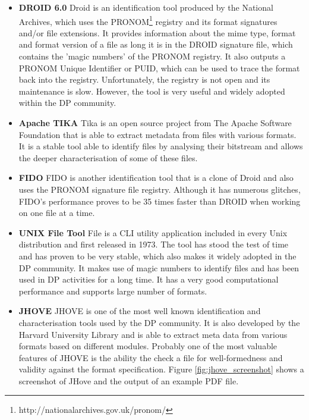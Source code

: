 \begin{itemize}
\item \textbf{DROID 6.0}\newline
Droid is an identification tool produced by the National Archives, which uses the PRONOM\footnote{http://nationalarchives.gov.uk/pronom/} registry and its format signatures and/or file extensions. It provides information about the mime type, format and format version of a file as long it is in the DROID signature file, which contains the 'magic numbers' of the PRONOM registry. It also outputs a PRONOM Unique Identifier or PUID, which can be used to trace the format back into the registry.
Unfortunately, the registry is not open and its maintenance is slow. However, the tool is very useful and widely adopted within the DP community.

\item \textbf{Apache TIKA}\newline
Tika is an open source project from The Apache Software Foundation that is able to extract metadata from files with various formats. It is a stable tool able to identify files by analysing their bitstream and allows the deeper characterisation of some of these files.  

\item \textbf{FIDO}\newline
FIDO is another identification tool that is a clone of Droid and also uses the PRONOM signature file registry. Although it has numerous glitches, FIDO's performance proves to be 35 times faster than DROID when working on one file at a time.

\item \textbf{UNIX File Tool}\newline
File is a CLI utility application included in every Unix distribution and first released in 1973. The tool has stood the test of time and has proven to be very stable, which also makes it widely adopted in the DP community. It makes use of magic numbers to identify files and has been used in DP activities for a long time. It has a very good computational performance and supports large number of formats.

\item \textbf{JHOVE}\newline
JHOVE is one of the most well known identification and characterisation tools used by the DP community. It is also developed by the Harvard University Library and is able to extract meta data from various formats based on different modules. Probably one of the most valuable features of JHOVE is the ability the check a file for well-formedness and validity against the format specification. Figure \ref{fig:jhove_screenshot} shows a screenshot of JHove and the output of an example PDF file.


\end{itemize}
